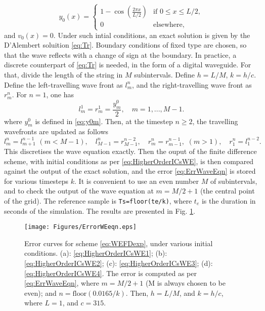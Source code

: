 \documentclass[11pt,twoside,a4paper,english]{book}
\begin{document}
\begin{equation}
y_0(x)  = 
\left\{ 
\begin{array}{ll}
1 - \cos \left(\frac{2\pi x}{L/2}\right)& \text{if }0\leq x \leq L/2, \\
0 & \text{elsewhere,}
\end{array}
\right.
\end{equation}
and $v_0(x)=0$. Under such intial conditions, an exact solution is given by the D'Alembert soluition \eqref{eq:Tr}. Boundary conditions of fixed type are chosen, so that the wave reflects with a change of sign at the boundary. In practice, a discrete counterpart of \eqref{eq:Tr} is needed, in the form of a digital waveguide. For that, divide the length of the string in $M$ subintervals. Define $h=L/M$, $k = h/c$. 
Define the left-travelling wave front as $l_{m}^n$, and the right-travelling wave front as $r^n_m$. For $n=1$, one has
\begin{equation}
l^1_m = r^1_m = \frac{y^0_m}{2},\quad m=1,...,M-1.
\end{equation}
 where $y^0_m$ is defined in \eqref{eq:y0m}. Then, at the timestep $n\geq 2$, the travelling wavefronts are updated as follows
\begin{equation}
l^n_m = l^{n-1}_{m+1}  \,\, (m < M-1), \quad
l^n_{M-1} = r^{n-2}_{M-1}, \quad
r^n_m = r^{n-1}_{m-1}, \,\, (m > 1), \quad
r^n_1 = l^{n-2}_{1}.
\end{equation}
This discretises the wave equation exactly. Then the ouput of the finite difference scheme, with initial conditions as per \eqref{eq:HigherOrderICsWE}, is then compared against the output of the exact solution, and the error \eqref{eq:ErrWaveEqn} is stored for various timesteps $k$. It is convenient to use an even number $M$ of subintervals, and to check the output of the wave equation at $m=M/2 +1$ (the central point of the grid). The reference sample is \texttt{Ts=floor(te/k)}, where $t_e$ is the duration in seconds of the simulation. The results are presented in Fig. \ref{fig:ErrorCurvesWE}. 
\begin{figure}[hbt]
\centering
\texttt{[image: Figures/ErrorWEeqn.eps]}
\caption{Error curves for scheme \eqref{eq:WEFDexp}, under various initial conditions. (a): \eqref{eq:HigherOrderICsWE1}; (b): \eqref{eq:HigherOrderICsWE2}; (c): \eqref{eq:HigherOrderICsWE3}; (d): \eqref{eq:HigherOrderICsWE4}. The error is computed as per \eqref{eq:ErrWaveEqn}, where $m = M/2 + 1$ (M is always chosen to be even); and $n = \text{floor}(0.0165/k)$. Then, $h=L/M$, and $k = h/c$, where $L=1$, and $c=315$.}\label{fig:ErrorCurvesWE}
\end{figure}
\end{document}
